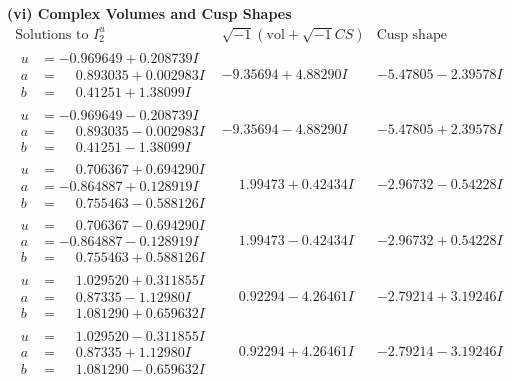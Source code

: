 \documentclass[1p]{elsarticle_modified}
\theoremstyle{definition}
\newcommand{\I}{\sqrt{-1}}
\begin{document}
\newpage\flushleft \textbf{(vi) Complex Volumes and Cusp Shapes}
$$\begin{array}{c|c|c}  
\text{Solutions to }I^u_{2}& \I (\text{vol} + \sqrt{-1}CS) & \text{Cusp shape}\\
 \hline 
\begin{aligned}
u &= -0.969649 + 0.208739 I \\
a &= \phantom{-}0.893035 + 0.002983 I \\
b &= \phantom{-}0.41251 + 1.38099 I\end{aligned}
 & -9.35694 + 4.88290 I & -5.47805 - 2.39578 I \\ \hline\begin{aligned}
u &= -0.969649 - 0.208739 I \\
a &= \phantom{-}0.893035 - 0.002983 I \\
b &= \phantom{-}0.41251 - 1.38099 I\end{aligned}
 & -9.35694 - 4.88290 I & -5.47805 + 2.39578 I \\ \hline\begin{aligned}
u &= \phantom{-}0.706367 + 0.694290 I \\
a &= -0.864887 + 0.128919 I \\
b &= \phantom{-}0.755463 - 0.588126 I\end{aligned}
 & \phantom{-}1.99473 + 0.42434 I & -2.96732 - 0.54228 I \\ \hline\begin{aligned}
u &= \phantom{-}0.706367 - 0.694290 I \\
a &= -0.864887 - 0.128919 I \\
b &= \phantom{-}0.755463 + 0.588126 I\end{aligned}
 & \phantom{-}1.99473 - 0.42434 I & -2.96732 + 0.54228 I \\ \hline\begin{aligned}
u &= \phantom{-}1.029520 + 0.311855 I \\
a &= \phantom{-}0.87335 - 1.12980 I \\
b &= \phantom{-}1.081290 + 0.659632 I\end{aligned}
 & \phantom{-}0.92294 - 4.26461 I & -2.79214 + 3.19246 I \\ \hline\begin{aligned}
u &= \phantom{-}1.029520 - 0.311855 I \\
a &= \phantom{-}0.87335 + 1.12980 I \\
b &= \phantom{-}1.081290 - 0.659632 I\end{aligned}
 & \phantom{-}0.92294 + 4.26461 I & -2.79214 - 3.19246 I \\ \hline\begin{aligned}

\end{aligned}
\end{array}$$
\end{document}
